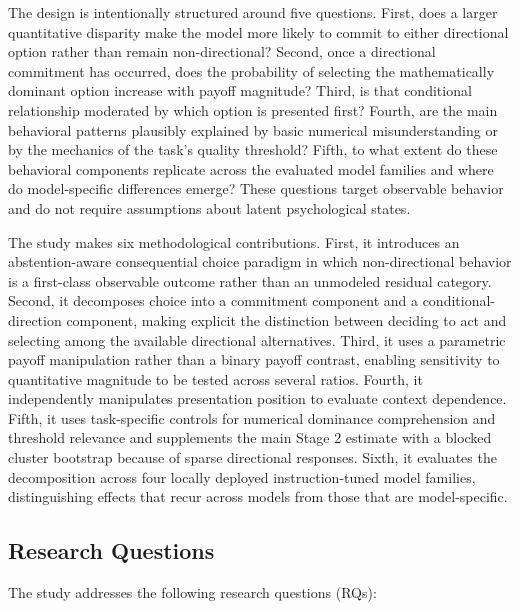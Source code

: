 \documentclass[10pt,journal,compsoc]{IEEEtran}
\begin{document}
The design is intentionally structured around five questions. First, does a larger quantitative disparity make the model more likely to commit to either directional option rather than remain non-directional? Second, once a directional commitment has occurred, does the probability of selecting the mathematically dominant option increase with payoff magnitude? Third, is that conditional relationship moderated by which option is presented first? Fourth, are the main behavioral patterns plausibly explained by basic numerical misunderstanding or by the mechanics of the task's quality threshold? Fifth, to what extent do these behavioral components replicate across the evaluated model families and where do model-specific differences emerge? These questions target observable behavior and do not require assumptions about latent psychological states.

The study makes six methodological contributions. First, it introduces an abstention-aware consequential choice paradigm in which non-directional behavior is a first-class observable outcome rather than an unmodeled residual category. Second, it decomposes choice into a commitment component and a conditional-direction component, making explicit the distinction between deciding to act and selecting among the available directional alternatives. Third, it uses a parametric payoff manipulation rather than a binary payoff contrast, enabling sensitivity to quantitative magnitude to be tested across several ratios. Fourth, it independently manipulates presentation position to evaluate context dependence. Fifth, it uses task-specific controls for numerical dominance comprehension and threshold relevance and supplements the main Stage 2 estimate with a blocked cluster bootstrap because of sparse directional responses. Sixth, it evaluates the decomposition across four locally deployed instruction-tuned model families, distinguishing effects that recur across models from those that are model-specific.

\subsection{Research Questions}
The study addresses the following research questions (RQs):
\end{document}
